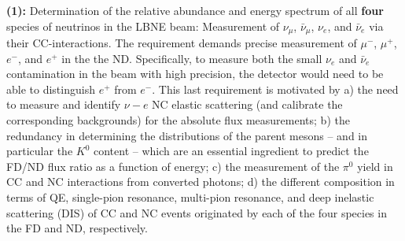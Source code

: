 \vspace{0.25cm} 
\noindent
{\bf (1):}  Determination of the relative abundance and 
energy spectrum of all  {\bf four} species of neutrinos in the LBNE beam: Measurement of 
$\nu_\mu$, $\bar \nu_\mu$, $\nu_e$, and $\bar \nu_e$ via their  CC-interactions.  
The requirement demands precise measurement of $\mu^-$, $\mu^+$, $e^-$, and $e^+$ in the 
the ND. Specifically, to measure both the small $\nu_e$ and $\bar \nu_e$ contamination in the beam with high precision, 
the detector would need to be able to distinguish $e^+$  from $e^-$. 
This last requirement is motivated by a) the need to measure and identify $\nu - e$ NC elastic scattering (and calibrate 
the corresponding backgrounds) for the absolute flux measurements; b) the redundancy in determining the distributions 
of the parent mesons -- and in particular the $K^0$ content -- which are an essential ingredient to predict 
the FD/ND flux ratio as a function of energy; c) the measurement of the $\pi^0$ yield in CC and NC interactions 
from converted photons; d) the different composition in terms of QE, single-pion resonance, multi-pion resonance, and deep inelastic scattering (DIS) of CC and NC events originated by each of the four species in the FD and ND, respectively. 



